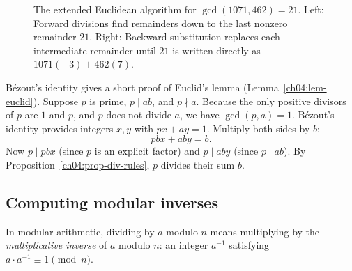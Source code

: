 \begin{figure}[htbp]
\caption{The extended Euclidean algorithm for $\gcd(1071, 462) = 21$. Left: Forward divisions find remainders down to the last nonzero remainder $21$. Right: Backward substitution replaces each intermediate remainder until $21$ is written directly as $1071(-3) + 462(7)$.}
\label{ch04:fig-bezout-ladder}
\end{figure}

\begin{whybox}
B\'ezout's identity gives a short proof of Euclid's lemma (Lemma~\ref{ch04:lem-euclid}). Suppose
$p$ is prime, $p \mid ab$, and $p \nmid a$. Because the only positive divisors of $p$ are $1$ and
$p$, and $p$ does not divide $a$, we have $\gcd(p, a) = 1$. B\'ezout's identity provides integers
$x, y$ with $px + ay = 1$. Multiply both sides by $b$:
\[
  pbx + aby = b.
\]
Now $p \mid pbx$ (since $p$ is an explicit factor) and $p \mid aby$ (since $p \mid ab$). By
Proposition~\ref{ch04:prop-div-rules}, $p$ divides their sum $b$.
\end{whybox}

\subsection*{Computing modular inverses}

In modular arithmetic, dividing by $a$ modulo $n$ means multiplying by the \emph{multiplicative
inverse} of $a$ modulo $n$: an integer $a^{-1}$ satisfying $a \cdot a^{-1} \equiv 1 \pmod n$.

